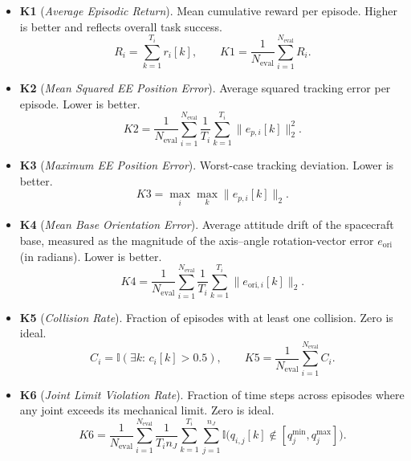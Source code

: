 \documentclass{ieeeaccess}
\begin{document}
\begin{itemize}
  \item \textbf{K1} (\emph{Average Episodic Return}). Mean cumulative reward per episode. Higher is better and
  reflects overall task success.
  \begin{equation*}
  R_i=\sum_{k=1}^{T_i} r_i[k], \qquad K1=\frac{1}{N_{\text{eval}}}\sum_{i=1}^{N_{\text{eval}}} R_i.
  \end{equation*}

  \item \textbf{K2} (\emph{Mean Squared EE Position Error}). Average squared tracking error per episode. Lower
  is better.
  \begin{equation*}
  K2=\frac{1}{N_{\text{eval}}}\sum_{i=1}^{N_{\text{eval}}}\frac{1}{T_i}\sum_{k=1}^{T_i}\|e_{p,i}[k]\|_2^2.
  \end{equation*}

  \item \textbf{K3} (\emph{Maximum EE Position Error}). Worst-case tracking deviation. Lower is better.
  \begin{equation*}
  K3=\max_{i}\max_{k}\|e_{p,i}[k]\|_2.
  \end{equation*}

  \item \textbf{K4} (\emph{Mean Base Orientation Error}). Average attitude drift of the spacecraft base, measured
  as the magnitude of the axis--angle rotation-vector error $e_{\mathrm{ori}}$ (in radians). Lower is better.
  \begin{equation*}
  K4=\frac{1}{N_{\text{eval}}}\sum_{i=1}^{N_{\text{eval}}}\frac{1}{T_i}\sum_{k=1}^{T_i}\|e_{\mathrm{ori},i}[k]\|_2.
  \end{equation*}

  \item \textbf{K5} (\emph{Collision Rate}). Fraction of episodes with at least one collision. Zero is
  ideal.
  \begin{equation*}
  C_i=\mathbb{I}(\exists k:\,c_i[k]>0.5), \qquad K5=\frac{1}{N_{\text{eval}}}\sum_{i=1}^{N_{\text{eval}}} C_i.
  \end{equation*}

  \item \textbf{K6} (\emph{Joint Limit Violation Rate}). Fraction of time steps across episodes where any
  joint exceeds its mechanical limit. Zero is ideal.
  \begin{equation*}
  K6=\frac{1}{N_{\text{eval}}}\sum_{i=1}^{N_{\text{eval}}}\frac{1}{T_i n_J}\sum_{k=1}^{T_i}\sum_{j=1}^{n_J}
  \mathbb{I}\!\big(q_{i,j}[k]\notin[q_j^{\min},q_j^{\max}]\big).
  \end{equation*}


\end{itemize}
\end{document}
